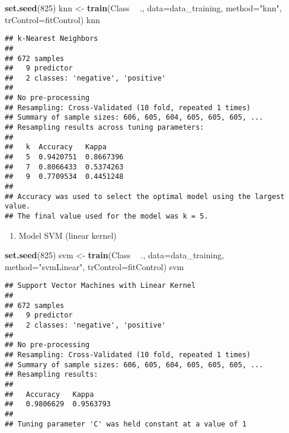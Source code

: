 \documentclass[]{article}
\newenvironment{Shaded}{\begin{snugshade}}{\end{snugshade}}
\newcommand{\DataTypeTok}[1]{\textcolor[rgb]{0.13,0.29,0.53}{#1}}
\newcommand{\DecValTok}[1]{\textcolor[rgb]{0.00,0.00,0.81}{#1}}
\newcommand{\KeywordTok}[1]{\textcolor[rgb]{0.13,0.29,0.53}{\textbf{#1}}}
\newcommand{\NormalTok}[1]{#1}
\newcommand{\OperatorTok}[1]{\textcolor[rgb]{0.81,0.36,0.00}{\textbf{#1}}}
\newcommand{\StringTok}[1]{\textcolor[rgb]{0.31,0.60,0.02}{#1}}
\providecommand{\tightlist}{%
  \setlength{\itemsep}{0pt}\setlength{\parskip}{0pt}}
\begin{document}
\begin{Shaded}
\begin{Highlighting}[]
\KeywordTok{set.seed}\NormalTok{(}\DecValTok{825}\NormalTok{)}
\NormalTok{knn <-}\StringTok{ }\KeywordTok{train}\NormalTok{(Class }\OperatorTok{~}\StringTok{ }\NormalTok{., }
             \DataTypeTok{data=}\NormalTok{data_training, }
             \DataTypeTok{method=}\StringTok{"knn"}\NormalTok{,}
             \DataTypeTok{trControl=}\NormalTok{fitControl)}
\NormalTok{knn}
\end{Highlighting}
\end{Shaded}

\begin{verbatim}
## k-Nearest Neighbors 
## 
## 672 samples
##   9 predictor
##   2 classes: 'negative', 'positive' 
## 
## No pre-processing
## Resampling: Cross-Validated (10 fold, repeated 1 times) 
## Summary of sample sizes: 606, 605, 604, 605, 605, 605, ... 
## Resampling results across tuning parameters:
## 
##   k  Accuracy   Kappa    
##   5  0.9420751  0.8667396
##   7  0.8066433  0.5374263
##   9  0.7709534  0.4451248
## 
## Accuracy was used to select the optimal model using the largest value.
## The final value used for the model was k = 5.
\end{verbatim}

\begin{enumerate}
\def\labelenumi{\arabic{enumi}.}
\setcounter{enumi}{4}
\tightlist
\item
  Model SVM (linear kernel)
\end{enumerate}

\begin{Shaded}
\begin{Highlighting}[]
\KeywordTok{set.seed}\NormalTok{(}\DecValTok{825}\NormalTok{)}
\NormalTok{svm <-}\StringTok{ }\KeywordTok{train}\NormalTok{(Class }\OperatorTok{~}\StringTok{ }\NormalTok{., }
             \DataTypeTok{data=}\NormalTok{data_training, }
             \DataTypeTok{method=}\StringTok{"svmLinear"}\NormalTok{,}
             \DataTypeTok{trControl=}\NormalTok{fitControl)}
\NormalTok{svm}
\end{Highlighting}
\end{Shaded}

\begin{verbatim}
## Support Vector Machines with Linear Kernel 
## 
## 672 samples
##   9 predictor
##   2 classes: 'negative', 'positive' 
## 
## No pre-processing
## Resampling: Cross-Validated (10 fold, repeated 1 times) 
## Summary of sample sizes: 606, 605, 604, 605, 605, 605, ... 
## Resampling results:
## 
##   Accuracy   Kappa    
##   0.9806629  0.9563793
## 
## Tuning parameter 'C' was held constant at a value of 1
\end{verbatim}
\end{document}
